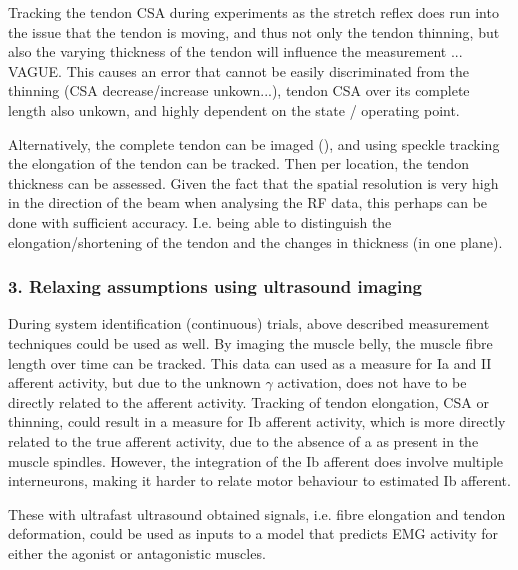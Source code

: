 Tracking the tendon CSA during experiments as the stretch reflex does run into the issue that the tendon is moving, and thus not only the tendon thinning, but also the varying thickness of the tendon will influence the measurement ... VAGUE. This causes an error that cannot be easily discriminated from the thinning (CSA decrease/increase unkown...), tendon CSA over its complete length also unkown, and highly dependent on the state / operating point.

Alternatively, the complete tendon can be imaged (), and using speckle tracking the elongation of the tendon can be tracked. Then per location, the tendon thickness can be assessed. Given the fact that the spatial resolution is very high in the direction of the beam when analysing the RF data, this perhaps can be done with sufficient accuracy. I.e. being able to distinguish the elongation/shortening of the tendon and the changes in thickness (in one plane).


\subsubsection{3. Relaxing assumptions using ultrasound imaging}
%

During system identification (continuous) trials, above described measurement techniques could be used as well. By imaging the muscle belly, the muscle fibre length over time can be tracked. This data can used as a measure for Ia and II afferent activity, but due to the unknown $\gamma$ activation, does not have to be directly related to the afferent activity. Tracking of tendon elongation, CSA or thinning, could result in a measure for Ib afferent activity, which is more directly related to the true afferent activity, due to the absence of a  as present in the muscle spindles. However, the integration of the Ib afferent does involve multiple interneurons, making it harder to relate motor behaviour to estimated Ib afferent.

These with ultrafast ultrasound obtained signals, i.e. fibre elongation and tendon deformation, could be used as inputs to a model that predicts EMG activity for either the agonist or antagonistic muscles. 





